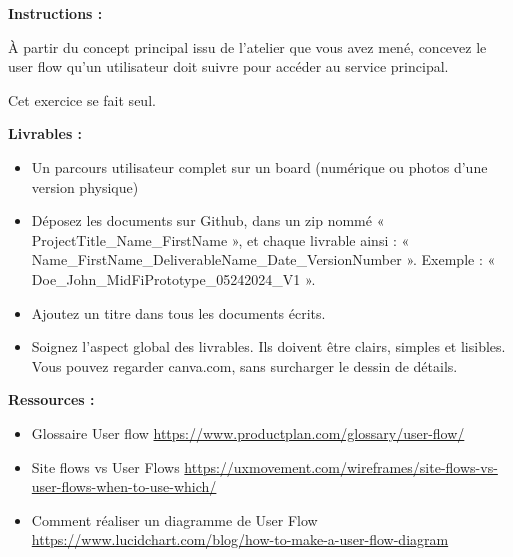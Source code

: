 \makeheaderfiles

\textbf{Instructions :}

À partir du concept principal issu de l'atelier que vous avez mené, concevez le user flow qu'un utilisateur doit suivre pour accéder au service principal.

Cet exercice se fait seul.

\textbf{Livrables :}

\begin{itemize}
\item Un parcours utilisateur complet sur un board (numérique ou photos d'une version physique)
\item Déposez les documents sur Github, dans un zip nommé « ProjectTitle\_Name\_FirstName », et chaque livrable ainsi : « Name\_FirstName\_DeliverableName\_Date\_VersionNumber ». Exemple : « Doe\_John\_MidFiPrototype\_05242024\_V1 ».
\item Ajoutez un titre dans tous les documents écrits.
\item Soignez l'aspect global des livrables. Ils doivent être clairs, simples et lisibles. Vous pouvez regarder canva.com, sans surcharger le dessin de détails.
\end{itemize}

\textbf{Ressources :}

\begin{itemize}
\item Glossaire User flow \url{https://www.productplan.com/glossary/user-flow/}
\item Site flows vs User Flows \url{https://uxmovement.com/wireframes/site-flows-vs-user-flows-when-to-use-which/}
\item Comment réaliser un diagramme de User Flow \url{https://www.lucidchart.com/blog/how-to-make-a-user-flow-diagram}
\end{itemize}

